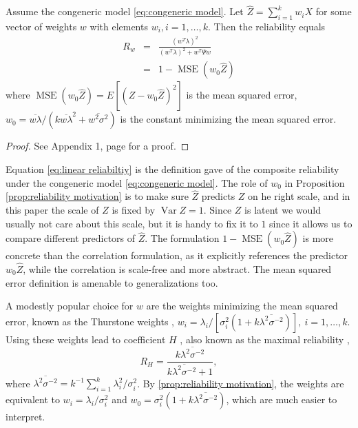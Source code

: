 \documentclass[twoside]{article}
\DeclareMathOperator{\Var}{Var}
\DeclareMathOperator{\MSE}{MSE}
\begin{document}
\begin{prop}
\label{prop:reliability motivation}Assume the congeneric model \eqref{eq:congeneric model}. Let $\hat{Z}=\sum_{i=1}^{k}w_{i}X$
for some vector of weights $w$ with elements $w_{i},i=1,\ldots,k$. Then the reliability equals
\begin{eqnarray}
 R_w & = & \frac{(w^{T}\lambda)^{2}}{(w^{T}\lambda)^{2}+w^{T}\Psi w}\label{eq:linear reliabiltiy}\\
 & = & 1- \MSE (w_{0}\hat{Z})\label{eq:MSE}
\end{eqnarray}
where $\MSE (w_{0}\hat{Z})=E[(Z-w_{0}\hat{Z})^{2}]$ is the
mean squared error, $w_{0}=\overline{w\lambda}/(k\overline{w\lambda}^{2}+\overline{w^{2}\sigma^{2}})$ is the constant minimizing the mean squared error.
\end{prop}
\begin{proof}
See Appendix 1, page \pageref{proof:reliability motivation} for a proof.
\end{proof}

Equation \eqref{eq:linear reliabiltiy} is the definition \citet[][p. 112]{Joreskog1971-nn} gave of the composite reliability under the congeneric model \eqref{eq:congeneric model}. 
The role of $w_0$ in Proposition \ref{prop:reliability motivation} is to make sure $\hat{Z}$ predicts $Z$ on he right scale, and in this paper the scale of $Z$ is fixed by $\Var Z = 1$. Since $Z$ is latent we would usually not care about this scale, but it is handy to fix it to $1$ since it allows us to compare different predictors of $\hat{Z}$. The formulation $1-\MSE (w_{0}\hat{Z})$ is more concrete than the correlation formulation, as it explicitly references the predictor $w_{0}\hat{Z}$, while the correlation is scale-free and more abstract. The mean squared error definition is amenable to generalizations too.

A modestly popular choice for $w$ are the weights minimizing the mean squared error, known as the Thurstone weights \citep{thurshronebook}, $w_{i}=\lambda_{i}/[\sigma_{i}^{2}(1+k\overline{\lambda^{2}\sigma^{-2}})],\:i=1,\ldots,k$. Using these weights lead to coefficient $H$ \citep{hancock2001rethinking}, also known as the maximal reliability \citep{Li1997-yh}, 
\begin{equation}
\label{eq:coefficient_H}
 R_{H}=\frac{k\overline{\lambda^{2}\sigma^{-2}}}{k\overline{\lambda^{2}\sigma^{-2}}+1},
\end{equation}
where $\overline{\lambda^{2}\sigma^{-2}} = k^{-1}\sum_{i=1}^{k}\lambda_{i}^2/\sigma_i^2$. By \cref{prop:reliability motivation}, the weights are equivalent to $w_i = \lambda_i/\sigma_i^2$ and $w_0 = \sigma_{i}^{2}(1+k\overline{\lambda^{2}\sigma^{-2}})$, which are much easier to interpret.
\end{document}
